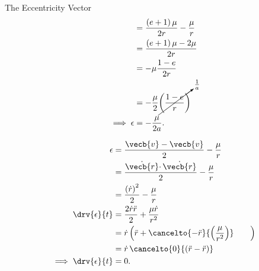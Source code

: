 \begin{hwkProblem}{1}{The Eccentricity Vector}
\begin{align*}
		\,                                & = \frac{\left(e + 1\right) \mu}{2 r} - \frac{\mu}{r}                                           \\
		\,                                & = \frac{\left(e + 1\right)\mu - 2 \mu}{2 r}                                                    \\
		\,                                & = - \mu \frac{1 - e}{2 r}                                                                      \\
		\,                                & = - \frac{\mu}{2} \cancelto{\frac{1}{a}}{\left(\frac{1 - e}{r}\right)}                         \\
		\implies \epsilon                 & = - \frac{\mu}{2 a}
		.\end{align*}

	\hwkPart{} \label{hwk:s01b}

	\begin{align*}
		\epsilon                   & = \frac{\vecb{v} - \vecb{v}}{2} - \frac{\mu}{r}                                                 \\
		\,                         & = \frac{\dot{\vecb{r}} \cdotp \dot{\vecb{r}}}{2} - \frac{\mu}{r}                                \\
		\,                         & = \frac{\left(\dot{r}\right)^{2}}{2} - \frac{\mu}{r}                                            \\
		\drv{\epsilon}{t}          & = \frac{2 \dot{r} \ddot{r}}{2} + \frac{\mu \dot{r}}{r^{2}}                                      \\
		\,                         & = \dot{r} \left(\ddot{r} + \cancelto{- \ddot{r}}{\left(\frac{\mu}{r^{2}}\right)} \qquad \right) \\
		\,                         & = \dot{r} \, \cancelto{0}{\left(\ddot{r} - \ddot{r}\right)}                                     \\
		\implies \drv{\epsilon}{t} & = 0
		.\end{align*}

\end{hwkProblem}

